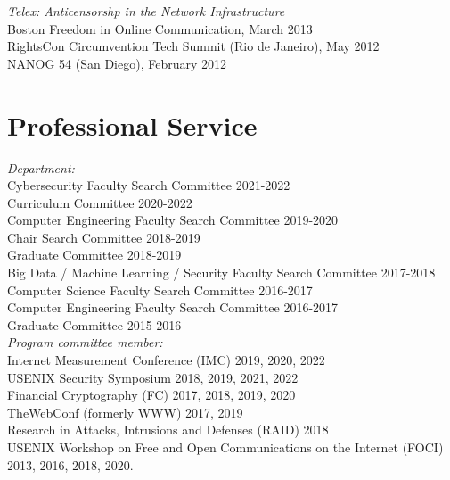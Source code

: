 \documentclass[margin,11pt]{res} %
\begin{document}
\emph{Telex: Anticensorshp in the Network Infrastructure} \\
    Boston Freedom in Online Communication, March 2013\\
    RightsCon Circumvention Tech Summit (Rio de Janeiro), May 2012 \\
    NANOG 54 (San Diego), February 2012 %




\vspace{6pt}
\section{\large Professional Service}

    \emph{Department:}\\
        Cybersecurity Faculty Search Committee 2021-2022 \\
        Curriculum Committee 2020-2022 \\
        Computer Engineering Faculty Search Committee 2019-2020 \\
        Chair Search Committee 2018-2019 \\
        Graduate Committee 2018-2019 \\
        Big Data / Machine Learning / Security Faculty Search Committee 2017-2018 \\
        Computer Science Faculty Search Committee 2016-2017 \\
        Computer Engineering Faculty Search Committee 2016-2017 \\
        Graduate Committee 2015-2016 \\

     \emph{Program committee member:}\\
            Internet Measurement Conference (IMC) 2019, 2020, 2022  \\
            USENIX Security Symposium 2018, 2019, 2021, 2022    \\
            Financial Cryptography (FC) 2017, 2018, 2019, 2020 \\
            TheWebConf (formerly WWW) 2017, 2019 \\
            Research in Attacks, Intrusions and Defenses (RAID) 2018 \\
            USENIX Workshop on Free and Open Communications on the Internet (FOCI) 2013, 2016, 2018, 2020. \\
\end{document}
